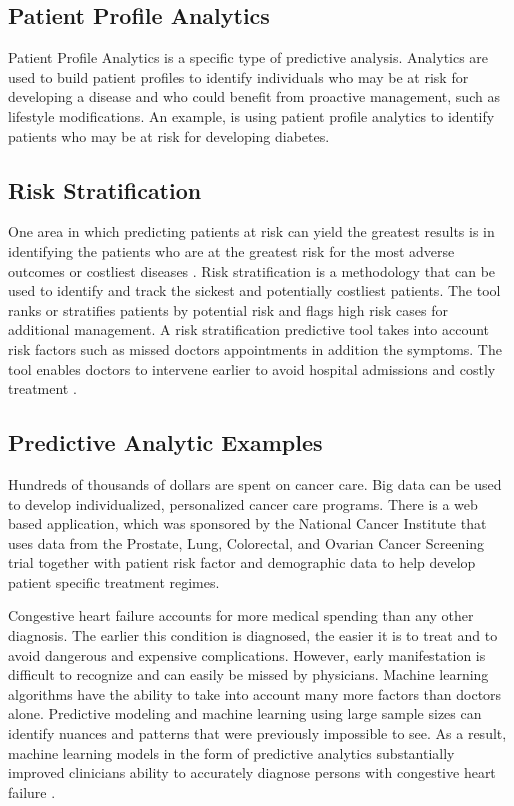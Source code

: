 \documentclass[sigconf]{acmart}
\begin{document}
\subsection{Patient Profile Analytics}

Patient Profile Analytics is a specific type of predictive analysis.  Analytics are used to build patient profiles to identify individuals who may be at risk for developing a disease and who could benefit from proactive management, such as lifestyle modifications.  An example, is using patient profile analytics to identify patients who may be at risk for developing diabetes. 

\subsection{Risk Stratification}
One area in which predicting patients at risk can yield the greatest results is in identifying the patients who are at the greatest risk for the most adverse outcomes or costliest diseases \cite{springer}. Risk stratification is a methodology that can be used to identify and track the sickest and potentially costliest patients. The tool ranks or stratifies patients by potential risk and flags high risk cases for additional management. A risk stratification predictive tool takes into account risk factors such as missed doctors appointments in addition the symptoms. The tool enables doctors to intervene earlier to avoid hospital admissions and costly treatment \cite{www-google-data}.

\subsection{ Predictive Analytic Examples}  
Hundreds of thousands of dollars are spent on cancer care. Big data can be used to develop individualized, personalized cancer care programs. There is a web based application, which was sponsored by the National Cancer Institute that uses data from the Prostate, Lung, Colorectal, and Ovarian Cancer Screening trial together with patient risk factor and demographic data to help develop patient specific treatment regimes. 

Congestive heart failure accounts for more medical spending than any other diagnosis. The earlier this condition is diagnosed, the easier it is to treat and to avoid dangerous and expensive complications.  However, early manifestation is difficult to recognize and can easily be missed by physicians. Machine learning algorithms have the ability to take into account many more factors than doctors alone. Predictive modeling and machine learning using large sample sizes can identify nuances and patterns that were previously impossible to see.  As a result, machine learning models in the form of predictive analytics substantially improved clinicians ability to accurately diagnose persons with congestive heart failure \cite{www-google-datapine}. 
\end{document}
